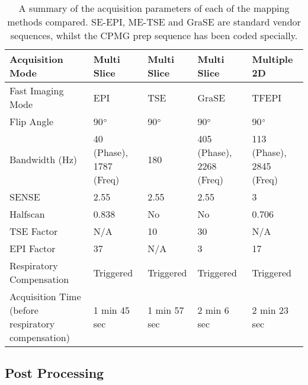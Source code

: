 \begin{table}[H]
\begin{adjustbox}{width=1.0\textwidth, center}
\begin{tabularx}{1.25\textwidth}{X|X|X|X|X}
		Acquisition Mode                                     & Multi Slice                     & Multi Slice                & Multi Slice        & Multiple 2D         \\ \hline
		Fast   Imaging Mode                                  & EPI                             & TSE                        & GraSE              & TFEPI               \\ \hline
		Flip Angle                                           & 90$\degree$                     & 90$\degree$                & 90$\degree$        & 90$\degree$         \\ \hline
		Bandwidth   (Hz)                                     & 40 (Phase), 1787 (Freq)         & 180                        & 405 (Phase), 2268 (Freq) & 113 (Phase), 2845 (Freq)\\ \hline
		SENSE                                                & 2.55                            & 2.55                       & 2.55               & 3                   \\ \hline
		Halfscan                                             & 0.838                           & No                         & No                 & 0.706               \\ \hline
		TSE Factor                                           & N/A                             & 10                         & 30                 & N/A                 \\ \hline
		EPI Factor                                           & 37                              & N/A                        & 3                  & 17                  \\ \hline
		Respiratory Compensation                             & Triggered                       & Triggered                  & Triggered          & Triggered           \\ \hline
		Acquisition Time \scriptsize{(before respiratory compensation)} & 1 min 45 sec                & 1 min 57 sec               & 2 min 6 sec        & 2 min 23 sec  
	\end{tabularx}
	\end{adjustbox}
	\caption{A summary of the acquisition parameters of each of the \ttwo mapping methods compared. \ac{SE}-\ac{EPI}, \ac{ME-TSE} and \ac{GraSE} are standard vendor sequences, whilst the \ac{CPMG} \ttwo prep sequence has been coded specially.}
	\label{tab:t2_sequence_overview}
\end{table}

\subsection{Post Processing}

